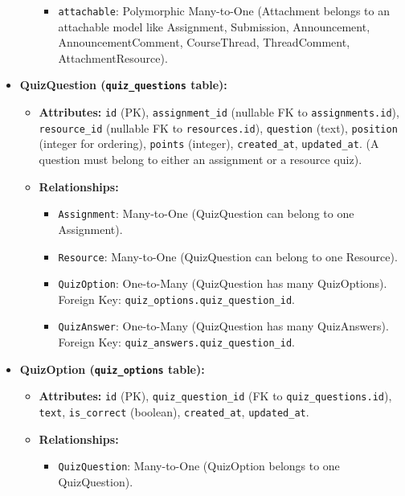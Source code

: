 \documentclass[12pt,a4paper]{article}
\begin{document}
\begin{itemize}
\begin{itemize}
        \begin{itemize}
            \item \texttt{attachable}: Polymorphic Many-to-One (Attachment belongs to an attachable model like Assignment, Submission, Announcement, AnnouncementComment, CourseThread, ThreadComment, AttachmentResource).
        \end{itemize}
    \end{itemize}
    \item \textbf{QuizQuestion (\texttt{quiz\_questions} table):}
    \begin{itemize}
        \item \textbf{Attributes:} \texttt{id} (PK), \texttt{assignment\_id} (nullable FK to \texttt{assignments.id}), \texttt{resource\_id} (nullable FK to \texttt{resources.id}), \texttt{question} (text), \texttt{position} (integer for ordering), \texttt{points} (integer), \texttt{created\_at}, \texttt{updated\_at}. (A question must belong to either an assignment or a resource quiz).
        \item \textbf{Relationships:}
        \begin{itemize}
            \item \texttt{Assignment}: Many-to-One (QuizQuestion can belong to one Assignment).
            \item \texttt{Resource}: Many-to-One (QuizQuestion can belong to one Resource).
            \item \texttt{QuizOption}: One-to-Many (QuizQuestion has many QuizOptions). Foreign Key: \texttt{quiz\_options.quiz\_question\_id}.
            \item \texttt{QuizAnswer}: One-to-Many (QuizQuestion has many QuizAnswers). Foreign Key: \texttt{quiz\_answers.quiz\_question\_id}.
        \end{itemize}
    \end{itemize}
    \item \textbf{QuizOption (\texttt{quiz\_options} table):}
    \begin{itemize}
        \item \textbf{Attributes:} \texttt{id} (PK), \texttt{quiz\_question\_id} (FK to \texttt{quiz\_questions.id}), \texttt{text}, \texttt{is\_correct} (boolean), \texttt{created\_at}, \texttt{updated\_at}.
        \item \textbf{Relationships:}
        \begin{itemize}
            \item \texttt{QuizQuestion}: Many-to-One (QuizOption belongs to one QuizQuestion).

\end{itemize}
\end{itemize}
\end{itemize}
\end{document}
